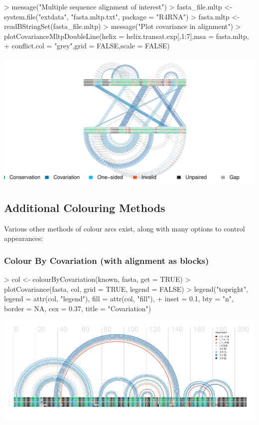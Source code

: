 \documentclass[letterpaper]{article}
\begin{document}
\begin{Schunk}
\begin{Sinput}
> message("Multiple sequence alignment of interest")
> fasta_file.mltp <- system.file("extdata", "fasta.mltp.txt", package = "R4RNA")
> fasta.mltp <- readBStringSet(fasta_file.mltp)
> message("Plot covariance in alignment")
> plotCovarianceMltpDoubleLine(helix = helix.transat.exp[,1:7],msa = fasta.mltp,
+                              conflict.col = "grey",grid = FALSE,scale = FALSE)
\end{Sinput}
\end{Schunk}
\includegraphics{R4RNA-024}


\subsection{Additional Colouring Methods}

Various other methods of colour arcs exist, along with many options to control
appearances:

\subsubsection{Colour By Covariation (with alignment as blocks)}

\begin{Schunk}
\begin{Sinput}
> col <- colourByCovariation(known, fasta, get = TRUE)
> plotCovariance(fasta, col, grid = TRUE, legend = FALSE)
> legend("topright", legend = attr(col, "legend"), fill = attr(col, "fill"),
+     inset = 0.1, bty = "n", border = NA, cex = 0.37, title = "Covariation")
\end{Sinput}
\end{Schunk}
\includegraphics{R4RNA-025}
\end{document}
